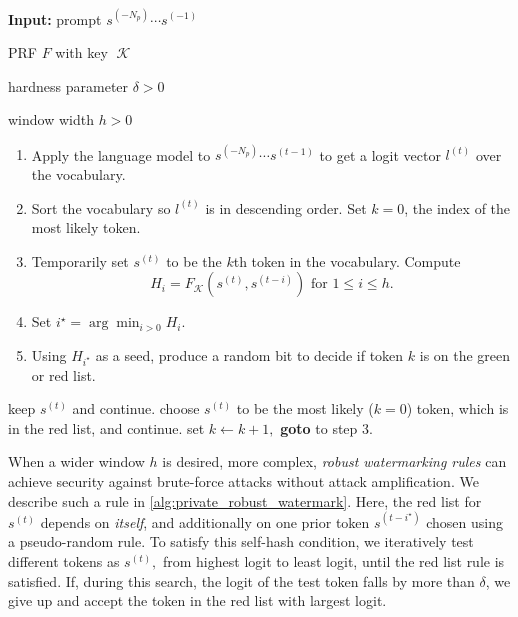 \documentclass{article}
\theoremstyle{plain}
\theoremstyle{definition}
\theoremstyle{remark}
\DeclareMathOperator*{\key}{{\mathcal{K}}}
\begin{document}
\begin{algorithm}[t]
   \caption{Robust Private Watermarking}
   \label{alg:private_robust_watermark}
\begin{algorithmic}
\STATE \textbf{Input:} prompt $s^{(-N_p)}\cdots s^{(-1)}$

\hspace{10.5mm}PRF $F$ with key $\key$

\hspace{10.5mm}hardness parameter $\delta>0$

\hspace{10.5mm}window width $h>0$

 \STATE 
 \begin{enumerate}
\item Apply the language model to $s^{(-N_p)}\cdots s^{(t-1)}$ to get a logit vector $l^{(t)}$ over the vocabulary. 
\item  Sort the vocabulary so $l^{(t)}$ is in descending order. Set $k = 0$, the index of the most likely token.
\item Temporarily set $s^{(t)}$ to be the $k$th token in the vocabulary. Compute
$$H_i = F_{\key}(s^{(t)},s^{(t-i)}) \text{ for } 1\le i \le h.$$
\item Set $i^\star = \arg\min_{i>0} H_i$.
\item Using $H_{i^\star}$ as a seed, produce a random bit to decide if token $k$ is on the green or red list.
\end{enumerate}
\STATE keep $s^{(t)}$ and continue.
\STATE choose  $s^{(t)}$ to be the most likely ($k=0$) token, which is in the red list, and continue.
\ELSE 
\STATE set $k\gets k+1,$ \textbf{goto} to step 3.
\ENDIF
\ENDFOR
\end{algorithmic}
\end{algorithm}

\vspace{.5cm}
 When a wider window $h$ is desired, more complex, \textit{robust watermarking rules} can achieve security against brute-force attacks without attack amplification. We describe such a rule in \cref{alg:private_robust_watermark}.  Here, the red list for $s^{(t)}$ depends on {\em itself}, and additionally on one prior token $s^{(t-i^\star)}$ chosen using a pseudo-random rule. To satisfy this self-hash condition, we iteratively test different tokens as $s^{(t)},$ from highest logit to least logit, until the red list rule is satisfied.  If, during this search, the logit of the test token falls by more than $\delta$, we give up and accept the token in the red list with largest logit.
\end{document}
